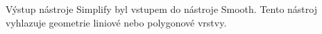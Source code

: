 Výstup nástroje Simplify byl vstupem do nástroje Smooth. Tento nástroj vyhlazuje geometrie
liniové nebo polygonové vrstvy. 

% 
% 
